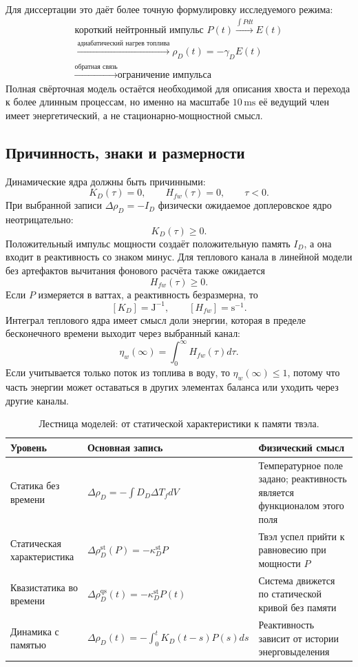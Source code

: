 \documentclass[12pt]{article}
\begin{document}
Для диссертации это даёт более точную формулировку исследуемого режима:
\[
\boxed{
\begin{gathered}
\text{короткий нейтронный импульс }P(t)
\xrightarrow{\int Pdt}
E(t)\\
\xrightarrow{\text{адиабатический нагрев топлива}}
\rho_D(t)=-\gamma_D E(t)\\
\xrightarrow{\text{обратная связь}}
\text{ограничение импульса}
\end{gathered}
}
\]
Полная свёрточная модель остаётся необходимой для описания хвоста и перехода к более длинным процессам, но именно на масштабе \(10\,\mathrm{ms}\) её ведущий член имеет энергетический, а не стационарно-мощностной смысл.

\subsection{Причинность, знаки и размерности}

Динамические ядра должны быть причинными:
\[
K_D(\tau)=0,
\qquad
H_{fw}(\tau)=0,
\qquad
\tau<0.
\]
При выбранной записи \(\Delta\rho_D=-I_D\) физически ожидаемое доплеровское ядро неотрицательно:
\[
K_D(\tau)\ge0.
\]
Положительный импульс мощности создаёт положительную память \(I_D\), а она входит в реактивность со знаком минус. Для теплового канала в линейной модели без артефактов вычитания фонового расчёта также ожидается
\[
H_{fw}(\tau)\ge0.
\]
Если \(P\) измеряется в ваттах, а реактивность безразмерна, то
\[
[K_D]=\mathrm{J}^{-1},
\qquad
[H_{fw}]=\mathrm{s}^{-1}.
\]
Интеграл теплового ядра имеет смысл доли энергии, которая в пределе бесконечного времени выходит через выбранный канал:
\[
\eta_w(\infty)=\int_0^\infty H_{fw}(\tau)d\tau.
\]
Если учитывается только поток из топлива в воду, то \(\eta_w(\infty)\le1\), потому что часть энергии может оставаться в других элементах баланса или уходить через другие каналы.

\begin{table}[H]
\centering
\caption{Лестница моделей: от статической характеристики к памяти твэла.}
\label{tab:static_to_memory_ladder}
\begin{tabular}{|>{\centering\arraybackslash}p{3.0cm}|p{5.2cm}|p{5.4cm}|}
\hline
Уровень & Основная запись & Физический смысл\\
\hline
Статика без времени & \(\Delta\rho_D=-\int D_D\Delta T_f dV\) & Температурное поле задано; реактивность является функционалом этого поля\\
\hline
Статическая характеристика & \(\Delta\rho_D^{\mathrm{st}}(P)=-\kappa_D^{\mathrm{st}}P\) & Твэл успел прийти к равновесию при мощности \(P\)\\
\hline
Квазистатика во времени & \(\Delta\rho_D^{\mathrm{qs}}(t)=-\kappa_D^{\mathrm{st}}P(t)\) & Система движется по статической кривой без памяти\\
\hline
Динамика с памятью & \(\Delta\rho_D(t)=-\int_0^tK_D(t-s)P(s)ds\) & Реактивность зависит от истории энерговыделения\\
\hline
\end{tabular}
\end{table}
\end{document}
